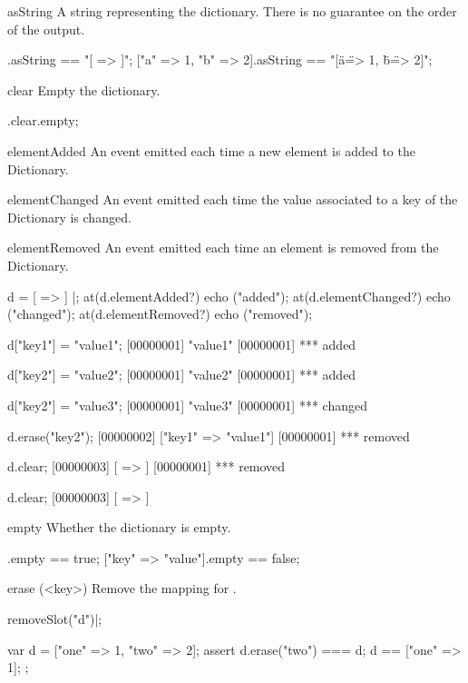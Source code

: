 \begin{urbiscriptapi}
\item[asString] A string representing the dictionary.  There is no guarantee
  on the order of the output.
\begin{urbiassert}
                [=>].asString == "[ => ]";
["a" => 1, "b" => 2].asString == "[\"a\" => 1, \"b\" => 2]";
\end{urbiassert}


\item[clear]
  Empty the dictionary.

\begin{urbiassert}
["one" => 1].clear.empty;
\end{urbiassert}


\item[elementAdded] An event emitted each time a new element is added to
  the Dictionary.


\item[elementChanged] An event emitted each time the value associated to a
  key of the Dictionary is changed.


\item[elementRemoved] An event emitted each time an element is removed from
  the Dictionary.

\begin{urbiscript}
d = [ => ] |;
at(d.elementAdded?) echo ("added");
at(d.elementChanged?) echo ("changed");
at(d.elementRemoved?) echo ("removed");

d["key1"] = "value1";
[00000001] "value1"
[00000001] *** added

d["key2"] = "value2";
[00000001] "value2"
[00000001] *** added

d["key2"] = "value3";
[00000001] "value3"
[00000001] *** changed

d.erase("key2");
[00000002] ["key1" => "value1"]
[00000001] *** removed

d.clear;
[00000003] [ => ]
[00000001] *** removed

d.clear;
[00000003] [ => ]
\end{urbiscript}


\item[empty]
  Whether the dictionary is empty.

\begin{urbiassert}
[=>].empty == true;
["key" => "value"].empty == false;
\end{urbiassert}


\item[erase](<key>) Remove the mapping for .
\begin{urbicomment}
removeSlot("d")|;
\end{urbicomment}
\begin{urbiscript}
{
  var d = ["one" => 1, "two" => 2];
  assert
  {
    d.erase("two") === d;
    d == ["one" => 1];
  };

}
\end{urbiscript}
\end{urbiscriptapi}
